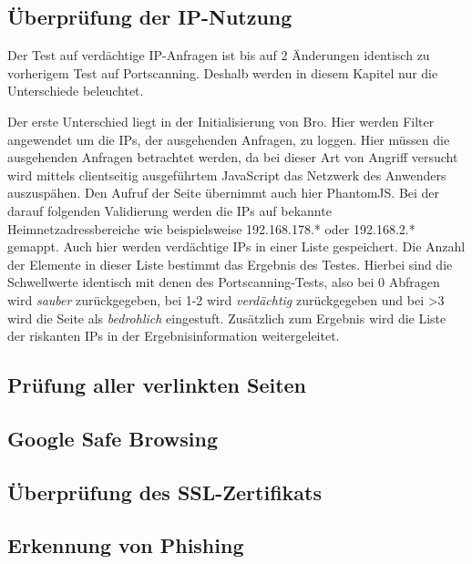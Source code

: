 \subsection{Überprüfung der IP-Nutzung}
Der Test auf verdächtige IP-Anfragen ist bis auf 2 Änderungen identisch zu vorherigem Test auf Portscanning. Deshalb werden in diesem Kapitel nur die Unterschiede beleuchtet.

Der erste Unterschied liegt in der Initialisierung von Bro. Hier werden Filter angewendet um die IPs, der ausgehenden Anfragen, zu loggen. Hier müssen die ausgehenden Anfragen betrachtet werden, da bei dieser Art von Angriff versucht wird mittels clientseitig ausgeführtem JavaScript das Netzwerk des Anwenders auszuspähen. Den Aufruf der Seite übernimmt auch hier PhantomJS. Bei der darauf folgenden Validierung werden die IPs auf bekannte Heimnetzadressbereiche wie beispielsweise 192.168.178.* oder 192.168.2.* gemappt. Auch hier werden verdächtige IPs in einer Liste gespeichert. Die Anzahl der Elemente in dieser Liste bestimmt das Ergebnis des Testes. Hierbei sind die Schwellwerte identisch mit denen des Portscanning-Tests, also bei 0 Abfragen wird \textit{sauber} zurückgegeben, bei 1-2 wird \textit{verdächtig} zurückgegeben und bei >3 wird die Seite als \textit{bedrohlich} eingestuft. Zusätzlich zum Ergebnis wird die Liste der riskanten IPs in der Ergebnisinformation weitergeleitet.

\subsection{Prüfung aller verlinkten Seiten}


\subsection{Google Safe Browsing}


\subsection{Überprüfung des SSL-Zertifikats}


\subsection{Erkennung von Phishing}


